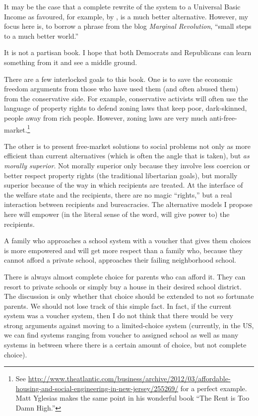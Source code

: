 It may be the case that a complete rewrite of the system to a Universal Basic
Income as favoured, for example, by \citet{Murray_IOH}, is a much better
alternative. However, my focus here is, to borrow a phrase from the blog
\emph{Marginal Revolution}, ``small steps to a much better world.''

It is not a partisan book. I hope that both Democrats and Republicans can learn
something from it and see a middle ground.

\bigskip

There are a few interlocked goals to this book. One is to save the economic
freedom arguments from those who have used them (and often abused them) from
the conservative side. For example, conservative activists will often use the
language of property rights to defend zoning laws that keep poor, dark-skinned,
people away from rich people. However, zoning laws are very much
anti-free-market.\footnote{See
\url{http://www.theatlantic.com/business/archive/2012/03/affordable-housing-and-social-engineering-in-new-jersey/255269/}
for a perfect example. Matt Yglesias makes the same point in his wonderful book
``The Rent is Too Damn High.''} %

The other is to present free-market solutions to social problems not only as
more efficient than current alternatives (which is often the angle that is
taken), but \emph{as morally superior}. Not morally superior only because they
involve less coercion or better respect property rights (the traditional
libertarian goals), but morally superior because of the way in which recipients
are treated. At the interface of the welfare state and the recipients, there
are no magic ``rights,'' but a real interaction between recipients and
bureacracies. The alternative models I propose here will empower (in the
literal sense of the word, will give power to) the recipients.

A family who approaches a school system with a voucher that gives them choices
is more empowered and will get more respect than a family who, because they
cannot afford a private school, approaches their failing neighborhood school.

There is always almost complete choice for parents who can afford it. They can
resort to private schools or simply buy a house in their desired school
district. The discussion is only whether that choice should be extended to not
so fortunate parents. We should not lose track of this simple fact.  In fact,
if the current system was a voucher system, then I do not think that there
would be very strong arguments against moving to a limited-choice system
(currently, in the US, we can find systems ranging from voucher to assigned
school as well as many systems in between where there is a certain amount of
choice, but not complete choice).

